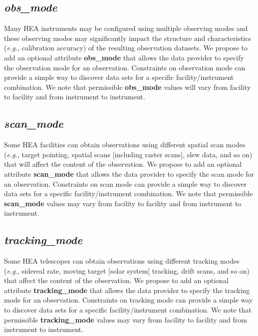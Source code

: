 \documentclass[11pt,a4paper]{ivoa}
\begin{document}
\subsection{{\em obs\_mode}}

Many HEA instruments may be configured using multiple observing modes and these observing modes may significantly impact the structure and characteristics ({\em e.g.\/}, calibration accuracy) of the resulting observation datasets.  We propose to add an optional attribute {\bf obs\_mode} that allows the data provider to specify the observation mode for an observation.  Constraints on observation mode can provide a simple way to discover data sets for a specific facility/instrument combination.  We note that permissible {\bf obs\_mode} values will vary from facility to facility and from instrument to instrument.

\subsection{{\em scan\_mode}}

Some HEA facilities can obtain observations using different spatial scan modes ({\em e.g.\/}, target pointing, spatial scans [including raster scans], slew data, and so on) that will affect the content of the observation.  We propose to add an optional attribute {\bf scan\_mode} that allows the data provider to specify the scan mode for an observation.  Constraints on scan mode can provide a simple way to discover data sets for a specific facility/instrument combination.  We note that permissible {\bf scan\_mode} values may vary from facility to facility and from instrument to instrument.

\subsection{{\em tracking\_mode}}

Some HEA telescopes can obtain observations using different tracking modes ({\em e.g.\/}, sidereal rate, moving target [solar system] tracking, drift scans, and so on) that affect the content of the observation.  We propose to add an optional attribute {\bf tracking\_mode} that allows the data provider to specify the tracking mode for an observation.  Constraints on tracking mode can provide a simple way to discover data sets for a specific facility/instrument combination.  We note that permissible {\bf tracking\_mode} values may vary from facility to facility and from instrument to instrument.
\end{document}
